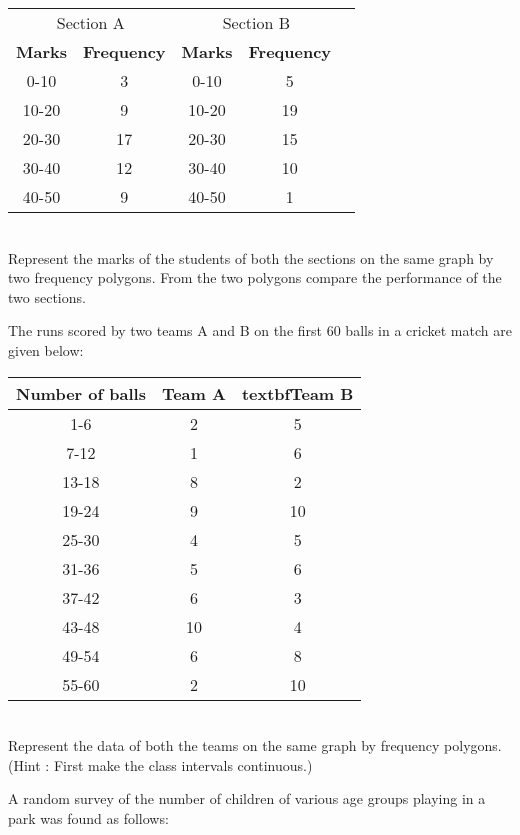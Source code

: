 \begin{tabular}{|c|c|c|c|c|}
\hline
 \multicolumn{2}{c|}{Section A}  
    &\multicolumn{2}{c|}{Section B} \\
\cline{2-4}

 \textbf{Marks} &\textbf{Frequency} &\textbf{Marks} &\textbf{Frequency} \\
\hline
0-10 &3 &0-10 &5\\
10-20 &9 &10-20 &19\\
20-30 &17 &20-30 &15\\
30-40 &12 &30-40 &10\\
40-50 &9 &40-50 &1\\
\hline

\end{tabular}\\

Represent the marks of the students of both the sections on the same graph by two frequency polygons. From the two polygons compare the performance of the two sections.\\
\item The runs scored by two teams A and B on the first 60 balls in a cricket match are given below:\\

\begin{tabular}{|c|c|c|}
\hline
\textbf{Number of balls} &\textbf{Team A}  &textbf{Team B}\\
\hline
1-6 &2 &5\\
7-12 &1 &6\\
13-18 &8 &2\\
19-24 &9 &10\\
25-30 &4 &5\\
31-36 &5 &6\\
37-42 &6 &3\\
43-48 &10 &4\\
49-54 &6 &8\\
55-60 &2 &10\\
\hline
\end{tabular}\\

Represent the data of both the teams on the same graph by frequency polygons.\\
(Hint : First make the class intervals continuous.)\\
\item A random survey of the number of children of various age groups playing in a park was found as follows:\\

